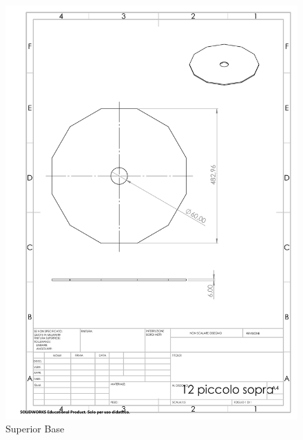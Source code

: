 \documentclass{article}
\begin{document}
\newpage
\begin{figure}[H]
    \centering
    \includegraphics[width=.9\linewidth]{technical_drawings/12_piccolo sopra.pdf}
    \caption{Superior Base}
    \label{fig:12_piccolo_sopra}
\end{figure}
\end{document}
